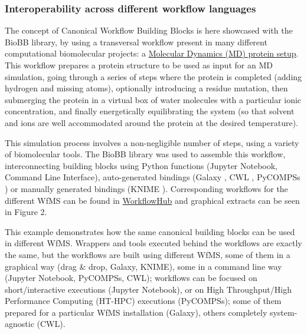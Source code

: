 \hypertarget{interoperability-across-different-workflow-languages}{%
\subsubsection{Interoperability across different workflow
languages}\label{interoperability-across-different-workflow-languages}}

The concept of Canonical Workflow Building Blocks is here showcased with
the BioBB library, by using a transversal workflow present in many
different computational biomolecular projects: a
\href{http://mmb.irbbarcelona.org/biobb/workflows/tutorials/md_setup}{Molecular
Dynamics (MD) protein setup}. This workflow prepares a protein structure
to be used as input for an MD simulation, going through a series of
steps where the protein is completed (adding hydrogen and missing
atoms), optionally introducing a residue mutation, then submerging the
protein in a virtual box of water molecules with a particular ionic
concentration, and finally energetically equilibrating the system (so
that solvent and ions are well accommodated around the protein at the
desired temperature).

This simulation process involves a non-negligible number of steps, using
a variety of biomolecular tools. The BioBB library was used to assemble
this workflow, interconnecting building blocks using Python functions
(Jupyter Notebook, Command Line Interface), auto-generated bindings
(Galaxy \cite{Afgan 2018}, CWL \cite{Crusoe 2022}, PyCOMPSs \cite{ch6-20}) or manually generated
bindings (KNIME \cite{ch6-21}). Corresponding workflows for the different
WfMS can be found in
\href{https://workflowhub.eu/collections/3}{WorkflowHub} \cite{ch6-22,ch6-23,ch6-24,ch6-25,ch6-26}
and graphical extracts can be seen in Figure 2.

This example demonstrates how the same canonical building blocks can be
used in different WfMS. Wrappers and tools executed behind the workflows
are exactly the same, but the workflows are built using different WfMS,
some of them in a graphical way (drag \& drop, Galaxy, KNIME), some in a
command line way (Jupyter Notebook, PyCOMPSs, CWL); workflows can be
focused on short/interactive executions (Jupyter Notebook), or on High
Throughput/High Performance Computing (HT-HPC) executions (PyCOMPSs);
some of them prepared for a particular WfMS installation (Galaxy),
others completely system-agnostic (CWL).

